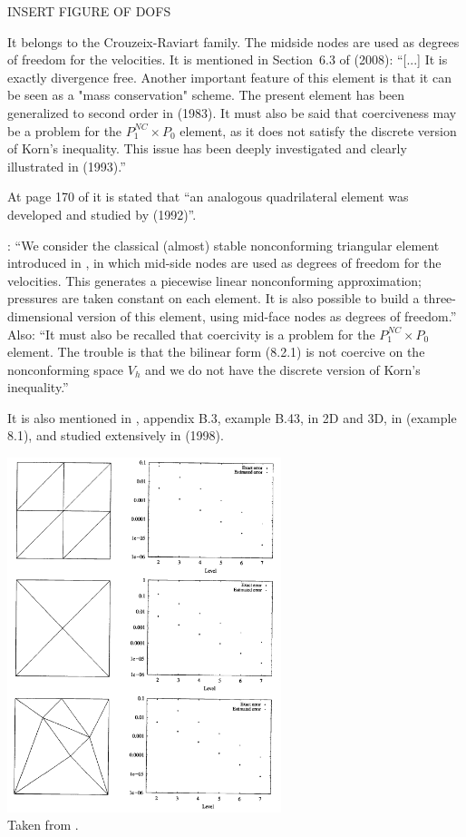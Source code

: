 
INSERT FIGURE OF DOFS

It belongs to the Crouzeix-Raviart family. 
The midside nodes are used as degrees of freedom for the velocities.
It is mentioned in Section~6.3 of \textcite{bobf08} (2008): ``[...]
It is exactly divergence free. Another important feature of this
element is that it can be seen as a "mass conservation" scheme. The present element
has been generalized to second order in \textcite{foso83} (1983).
It must also be said that coerciveness may be a problem for the $P_1^{NC} \times P_0$ 
element, as it does not satisfy the discrete version of Korn’s inequality. 
This issue has been deeply investigated and clearly illustrated in \textcite{arno93} (1993).''

At page 170 of \cite{braess} it is stated that ``an analogous quadrilateral element was 
developed and studied by \textcite{ratu92} (1992)''.

\textcite{bobf13}: ``We consider the classical (almost) stable nonconforming triangular 
element introduced in \textcite{crra73}, in which mid-side nodes are used as degrees of 
freedom for the velocities. This generates
a piecewise linear nonconforming approximation; pressures are taken constant on
each element. It is also possible to build a three-dimensional
version of this element, using mid-face nodes as degrees of freedom.''
Also: ``It must also be recalled that coercivity is a problem for the $P_1^{NC}\times P_0$ 
element. The trouble is that the bilinear form (8.2.1) is not coercive on the 
nonconforming space $V_h$ and we do not have the discrete version of Korn's inequality.''

It is also mentioned in \textcite{john16}, appendix B.3, example B.43, in 2D and 3D, 
in \textcite{brfo} (example 8.1), and studied extensively in \textcite{john98} (1998). 

\begin{center}
\includegraphics[width=8cm]{images/pair_p1ncp0/john98}\\
{\captionfont Taken from \textcite{john98}.}
\end{center}


